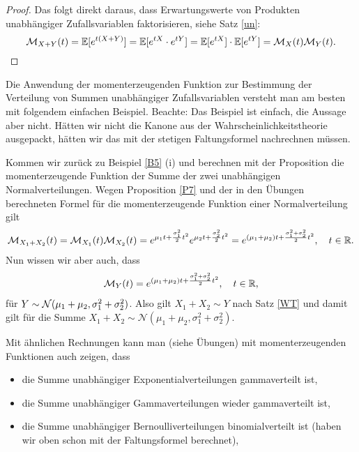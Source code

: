 \begin{proof} 
Das folgt direkt daraus, dass Erwartungswerte von Produkten unabh\"angiger Zufallsvariablen faktorisieren, siehe Satz \ref{un}:
	$$\mathcal{M}_{X+Y}(t) = \mathbb{E}[e^{t(X+Y)}] = \mathbb{E}[e^{tX}\cdot e^{tY}] = \mathbb{E}[e^{tX}] \cdot \mathbb{E}[e^{tY}] = \mathcal{M}_X(t)\mathcal{M}_Y(t).$$
\end{proof}

Die Anwendung der momenterzeugenden Funktion zur Bestimmung der Verteilung von Summen unabh\"angiger Zufallsvariablen versteht man am besten mit folgendem einfachen Beispiel. Beachte: Das Beispiel ist einfach, die Aussage aber nicht. H\"atten wir nicht die Kanone aus der Wahrscheinlichkeitstheorie ausgepackt, h\"atten wir das mit der stetigen Faltungsformel nachrechnen m\"ussen. 

\begin{beispiel}\label{momg}
	Kommen wir zur\"uck zu Beispiel \ref{B5} (i) und berechnen mit der Proposition die momenterzeugende Funktion der Summe der zwei unabh\"angigen Normalverteilungen. Wegen Proposition \ref{P7} und der in den \"Ubungen berechneten Formel f\"ur die momenterzeugende Funktion einer Normalverteilung gilt
	\begin{gather*}
		\mathcal{M}_{X_1+X_2}(t) = \mathcal{M}_{X_1}(t)\mathcal{M}_{X_2}(t) = e^{\mu_1 t + \frac{\sigma_1^2}{2}t^2} e^{\mu_2 t + \frac{\sigma_2^2}{2}t^2}=e^{(\mu_1+\mu_2)t + \frac{\sigma_1^2 + \sigma_2^2}{2}t^2},\quad t\in\mathbb{R}.
	\end{gather*}
	Nun wissen wir aber auch, dass
	\begin{align*}
		\mathcal{M}_Y(t)=e^{(\mu_1+\mu_2)t + \frac{\sigma_1^2 + \sigma_2^2}{2}t^2}, \quad t\in\mathbb{R},
	\end{align*} 
	 f\"ur $Y \sim \mathcal{N}(\mu_1 + \mu_2, \sigma_1^2 + \sigma_2^2)$. Also gilt $X_1+X_2\sim Y$ nach Satz \ref{WT} und damit gilt f\"ur die Summe $X_1+X_2\sim \mathcal N(\mu_1+\mu_2,\sigma_1^2 + \sigma_2^2)$.
\end{beispiel}
Mit \"ahnlichen Rechnungen kann man (siehe \"Ubungen) mit momenterzeugenden Funktionen auch zeigen, dass
\begin{itemize}
	\item die Summe unabh\"angiger Exponentialverteilungen gammaverteilt ist,
	\item die Summe unabh\"angiger Gammaverteilungen wieder gammaverteilt ist,
	\item die Summe unabh\"angiger Bernoulliverteilungen binomialverteilt ist (haben wir oben schon mit der Faltungsformel berechnet),
\end{itemize}
